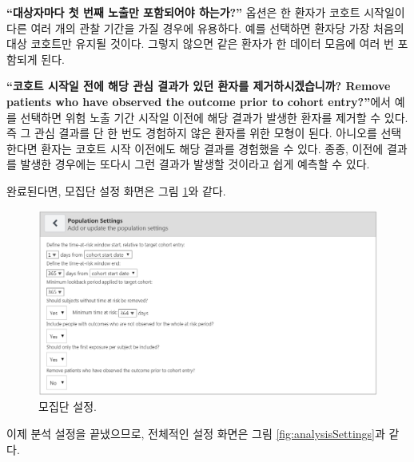 \documentclass[10.5pt]{book}
\theoremstyle{definition}
\theoremstyle{definition}
\theoremstyle{definition}
\theoremstyle{remark}
\begin{document}
\textbf{``대상자마다 첫 번째 노출만 포함되어야 하는가?''} 옵션은 한
환자가 코호트 시작일이 다른 여러 개의 관찰 기간을 가질 경우에 유용하다.
예를 선택하면 환자당 가장 처음의 대상 코호트만 유지될 것이다. 그렇지
않으면 같은 환자가 한 데이터 모음에 여러 번 포함되게 된다.

\textbf{``코호트 시작일 전에 해당 관심 결과가 있던 환자를
제거하시겠습니까? Remove patients who have observed the outcome prior to
cohort entry?''}에서 예를 선택하면 위험 노출 기간 시작일 이전에 해당
결과가 발생한 환자를 제거할 수 있다. 즉 그 관심 결과를 단 한 번도
경험하지 않은 환자를 위한 모형이 된다. 아니오를 선택한다면 환자는 코호트
시작 이전에도 해당 결과를 경험했을 수 있다. 종종, 이전에 결과를 발생한
경우에는 또다시 그런 결과가 발생할 것이라고 쉽게 예측할 수 있다.

완료된다면, 모집단 설정 화면은 그림 \ref{fig:populationSettings}와 같다.

\begin{figure}

{\centering \includegraphics[width=1\linewidth]{images/PatientLevelPrediction/populationSettings} 

}

\caption{모집단 설정.}\label{fig:populationSettings}
\end{figure}

이제 분석 설정을 끝냈으므로, 전체적인 설정 화면은 그림
\ref{fig:analysisSettings}과 같다.
\end{document}

